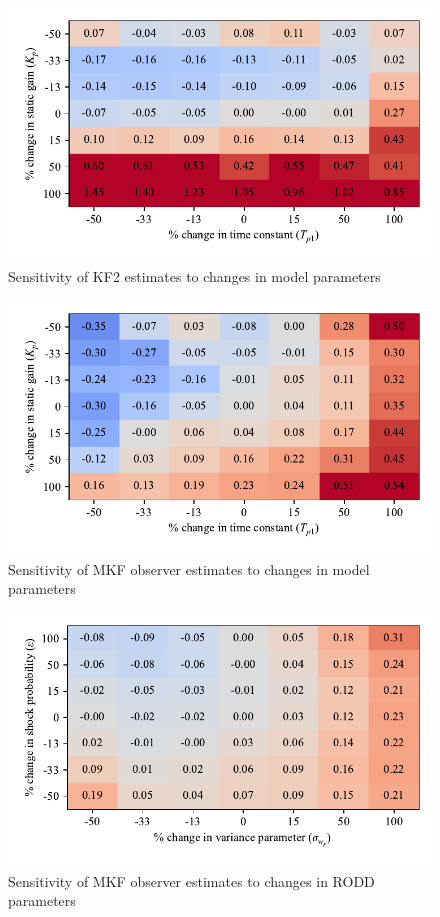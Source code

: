 \begin{figure}[htp]
	\centering
	\includegraphics[width=12.5cm]{images/rod_obs_sim_sens_model_KF2_MSE_y_est.pdf}
	\caption{Sensitivity of KF2 estimates to changes in model parameters}
	\label{fig:rod_obs_sim_sens_model_KF2_MSE_y_est}
\end{figure}

\begin{figure}[htp]
	\centering
	\includegraphics[width=12.5cm]{images/rod_obs_sim_sens_model_MKF_MSE_y_est.pdf}
	\caption{Sensitivity of MKF observer estimates to changes in model parameters}
	\label{fig:rod_obs_sim_sens_model_MKF_MSE_y_est}
\end{figure}

\begin{figure}[htp]
	\centering
	\includegraphics[width=12.5cm]{images/rod_obs_sim_sens_rod_MKF_MSE_y_est.pdf}
	\caption{Sensitivity of MKF observer estimates to changes in RODD parameters}
	\label{fig:rod_obs_sim_sens_rod_MKF_MSE_y_est}
\end{figure}


